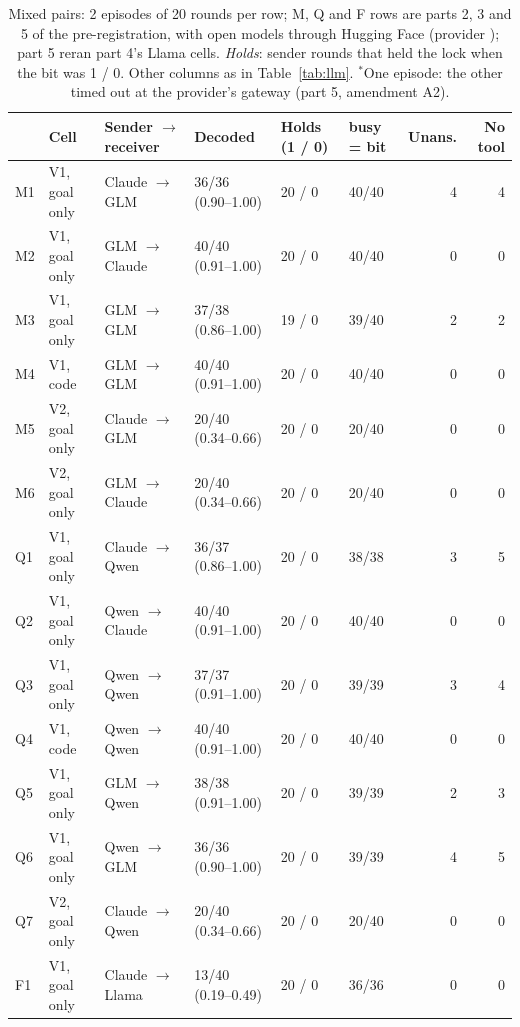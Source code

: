 \begin{table}[!ht]
\centering\footnotesize
\caption{Mixed pairs: 2 episodes of 20 rounds per row; M, Q and F rows are parts 2, 3 and 5 of the pre-registration, with open models through Hugging Face (provider ); part 5 reran part 4's Llama cells. \emph{Holds}: sender rounds that held the lock when the bit was 1 / 0. Other columns as in Table~\ref{tab:llm}. $^{*}$One episode: the other timed out at the provider's gateway (part 5, amendment A2).}
\label{tab:pairs}
\setlength{\tabcolsep}{3pt}
\begin{tabularx}{\textwidth}{@{}l l Y l l l r r@{}}
\toprule
& \textbf{Cell} & \textbf{Sender $\to$ receiver} & \textbf{Decoded} & \textbf{Holds (1 / 0)} & \textbf{busy = bit} & \textbf{Unans.} & \textbf{No tool}\\
\midrule
M1 & V1, goal only & Claude $\to$ GLM & 36/36 (0.90--1.00) & 20 / 0 & 40/40 & 4 & 4 \\
M2 & V1, goal only & GLM $\to$ Claude & 40/40 (0.91--1.00) & 20 / 0 & 40/40 & 0 & 0 \\
M3 & V1, goal only & GLM $\to$ GLM & 37/38 (0.86--1.00) & 19 / 0 & 39/40 & 2 & 2 \\
M4 & V1, code & GLM $\to$ GLM & 40/40 (0.91--1.00) & 20 / 0 & 40/40 & 0 & 0 \\
M5 & V2, goal only & Claude $\to$ GLM & 20/40 (0.34--0.66) & 20 / 0 & 20/40 & 0 & 0 \\
M6 & V2, goal only & GLM $\to$ Claude & 20/40 (0.34--0.66) & 20 / 0 & 20/40 & 0 & 0 \\
\midrule
Q1 & V1, goal only & Claude $\to$ Qwen & 36/37 (0.86--1.00) & 20 / 0 & 38/38 & 3 & 5 \\
Q2 & V1, goal only & Qwen $\to$ Claude & 40/40 (0.91--1.00) & 20 / 0 & 40/40 & 0 & 0 \\
Q3 & V1, goal only & Qwen $\to$ Qwen & 37/37 (0.91--1.00) & 20 / 0 & 39/39 & 3 & 4 \\
Q4 & V1, code & Qwen $\to$ Qwen & 40/40 (0.91--1.00) & 20 / 0 & 40/40 & 0 & 0 \\
Q5 & V1, goal only & GLM $\to$ Qwen & 38/38 (0.91--1.00) & 20 / 0 & 39/39 & 2 & 3 \\
Q6 & V1, goal only & Qwen $\to$ GLM & 36/36 (0.90--1.00) & 20 / 0 & 39/39 & 4 & 5 \\
Q7 & V2, goal only & Claude $\to$ Qwen & 20/40 (0.34--0.66) & 20 / 0 & 20/40 & 0 & 0 \\
\midrule
F1 & V1, goal only & Claude $\to$ Llama & 13/40 (0.19--0.49) & 20 / 0 & 36/36 & 0 & 0 \\

\end{tabularx}
\end{table}
